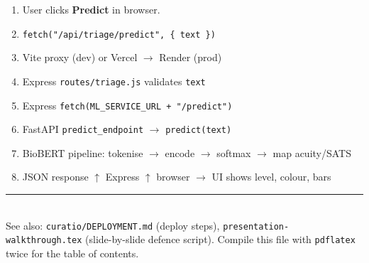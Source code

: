 \documentclass[11pt]{article}
\newcommand{\route}[1]{{\small\texttt{\textcolor{mutel}{#1}}}}
\begin{document}
\begin{flowbox}
\begin{enumerate}
  \item User clicks \textbf{Predict} in browser.
  \item \texttt{fetch("/api/triage/predict", \{ text \})}
  \item Vite proxy (dev) or Vercel $\to$ Render (prod)
  \item Express \texttt{routes/triage.js} validates \texttt{text}
  \item Express \texttt{fetch(ML\_SERVICE\_URL + "/predict")}
  \item FastAPI \texttt{predict\_endpoint} $\to$ \texttt{predict(text)}
  \item BioBERT pipeline: tokenise $\to$ encode $\to$ softmax $\to$ map acuity/SATS
  \item JSON response $\uparrow$ Express $\uparrow$ browser $\to$ UI shows level, colour, bars
\end{enumerate}
\end{flowbox}

\vfill
\noindent\rule{\textwidth}{0.4pt}\\[4pt]
{\small\textcolor{mutel}{See also: \route{curatio/DEPLOYMENT.md} (deploy steps),
\route{presentation-walkthrough.tex} (slide-by-slide defence script). Compile this file with
\texttt{pdflatex} twice for the table of contents.}}
\end{document}

